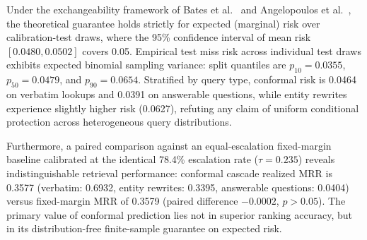 \documentclass[conference]{IEEEtran}
\begin{document}
Under the exchangeability framework of Bates et al.~\cite{bates2021conformal} and Angelopoulos et al.~\cite{angelopoulos2021gentle}, the theoretical guarantee holds strictly for expected (marginal) risk over calibration-test draws, where the 95\% confidence interval of mean risk $[0.0480, 0.0502]$ covers 0.05. Empirical test miss risk across individual test draws exhibits expected binomial sampling variance: split quantiles are $p_{10} = 0.0355$, $p_{50} = 0.0479$, and $p_{90} = 0.0654$. Stratified by query type, conformal risk is 0.0464 on verbatim lookups and 0.0391 on answerable questions, while entity rewrites experience slightly higher risk (0.0627), refuting any claim of uniform conditional protection across heterogeneous query distributions.

Furthermore, a paired comparison against an equal-escalation fixed-margin baseline calibrated at the identical 78.4\% escalation rate ($\tau = 0.235$) reveals indistinguishable retrieval performance: conformal cascade realized MRR is 0.3577 (verbatim: 0.6932, entity rewrites: 0.3395, answerable questions: 0.0404) versus fixed-margin MRR of 0.3579 (paired difference $-0.0002$, $p > 0.05$). The primary value of conformal prediction lies not in superior ranking accuracy, but in its distribution-free finite-sample guarantee on expected risk.

\begin{table}[t]
\centering\small
\caption{Conformal Cascade Calibration: Corrected Marginal Loss, High-Probability RCPS ($\delta=0.10$), and Equal-Escalation Baseline over 200 Cluster-Aware Splits ($N=2{,}754$ instances, nominal target $\epsilon=0.05$).}\label{tab:conformal_cascade_v6}
\end{table}
\end{document}
